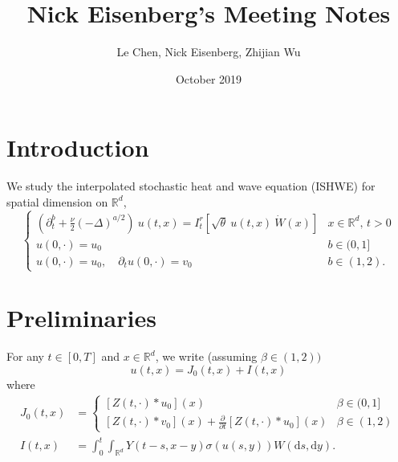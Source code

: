 \documentclass[a4paper,11pt]{article}
\title{Nick Eisenberg's Meeting Notes}
\author{Le Chen, Nick Eisenberg, Zhijian Wu}
\date{October 2019}
\numberwithin{equation}{section}
\theoremstyle{plain}
\theoremstyle{definition}
\newcommand{\ud}{\ensuremath{\mathrm{d} }}
\newcommand{\R}{\mathbb{R}}
\numberwithin{NQ}{section}
\numberwithin{LQ}{section}
\numberwithin{ZQ}{section}
\begin{document}
\section{Introduction}
We study the interpolated stochastic heat and wave equation (ISHWE) for spatial dimension on $\R^d$,
	\begin{equation}
	\label{E:SPDE}
	\begin{cases}
	\left(\partial^b_t + \frac{\nu}{2}(-\Delta)^{a/2}\right)\: u(t,x) = I^r_t \left[\sqrt{\theta}\: u(t,x)\: \dot W(x) \right] & \text{$x\in \R^d$, $t>0$} \\
	u(0,\cdot) = u_0                                                                                                            & b \in (0,1]               \\
	u(0,\cdot) = u_0, \quad \partial_t u(0,\cdot) = v_0                                                                            & b \in (1,2).
	\end{cases}
	\end{equation}


\section{Preliminaries}
For any $t \in [0,T]$ and $x \in \R^d$, we write (assuming $\beta \in (1,2))$
	\[
		u(t,x) = J_0(t,x) + I(t,x)
	\]
where
	\begin{align*}
		J_0(t,x) &=\begin{cases} 
							[Z(t,\cdot)*u_0](x) & \beta \in (0,1]
						\\	[Z(t,\cdot)*v_0](x) + \frac{\partial}{\partial t}[Z(t,\cdot)*u_0](x) & \beta \in (1,2)
							\end{cases}
	\\	I(t,x) &= \int_0^t \int_{\R^d} Y(t-s,x-y)\sigma(u(s,y)) W(\ud s, \ud y).
				\end{align*}
	
\end{document}
